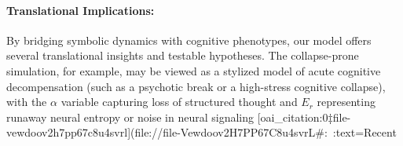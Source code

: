 \paragraph{Translational Implications:} By bridging symbolic dynamics with cognitive phenotypes, our model offers several translational insights and testable hypotheses. The collapse-prone simulation, for example, may be viewed as a stylized model of acute cognitive decompensation (such as a psychotic break or a high-stress cognitive collapse), with the $\alpha$ variable capturing loss of structured thought and $E_r$ representing runaway neural entropy or noise in neural signaling [oai_citation:0‡file-vewdoov2h7pp67c8u4svrl](file://file-Vewdoov2H7PP67C8u4svrL#:~:text=Recent%
